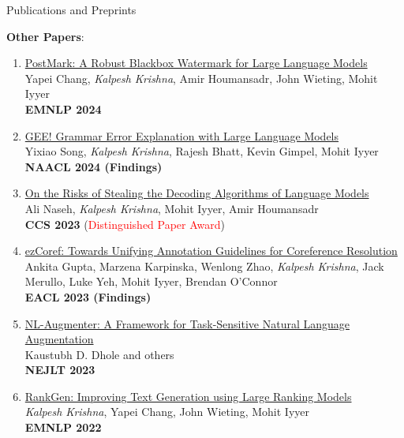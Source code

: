 \documentclass{resume} %
\begin{document}
\begin{rSection}{Publications and Preprints}
\begin{enumerate}[leftmargin=*]
\end{enumerate}

\vspace{0.1in}

\textbf{Other Papers}:
\begin{enumerate}[leftmargin=*]
\setlength\itemsep{0.4em}
\setcounter{enumi}{11}

\item \href{https://arxiv.org/abs/2406.14517}{PostMark: A Robust Blackbox Watermark for Large Language Models} \\
Yapei Chang, \emph{Kalpesh Krishna}, Amir Houmansadr, John Wieting, Mohit Iyyer \\
\textbf{EMNLP 2024}

\item \href{https://arxiv.org/abs/2311.09517}{GEE! Grammar Error Explanation with Large Language Models} \\
Yixiao Song, \emph{Kalpesh Krishna}, Rajesh Bhatt, Kevin Gimpel, Mohit Iyyer \\ \textbf{NAACL 2024 (Findings)}

\item \href{https://arxiv.org/abs/2303.04729}{On the Risks of Stealing the Decoding Algorithms of Language Models} \\
Ali Naseh, \emph{Kalpesh Krishna}, Mohit Iyyer, Amir Houmansadr \\
\textbf{CCS 2023} (\textcolor{red}{Distinguished Paper Award})


\item \href{https://arxiv.org/abs/2210.07188}{ezCoref: Towards Unifying Annotation Guidelines for Coreference Resolution} \\
Ankita Gupta, Marzena Karpinska, Wenlong Zhao, \emph{Kalpesh Krishna}, Jack Merullo, Luke Yeh, Mohit Iyyer, Brendan O'Connor \\
\textbf{EACL 2023 (Findings)}


\item \href{https://arxiv.org/abs/2112.02721}{NL-Augmenter: A Framework for Task-Sensitive Natural Language Augmentation} \\
Kaustubh D. Dhole and others \\
\textbf{NEJLT 2023}


\item \href{https://arxiv.org/abs/2205.09726}{RankGen: Improving Text Generation using Large Ranking Models} \\
\textit{Kalpesh Krishna}, Yapei Chang, John Wieting, Mohit Iyyer \\
\textbf{EMNLP 2022}


\end{enumerate}
\end{rSection}
\end{document}
